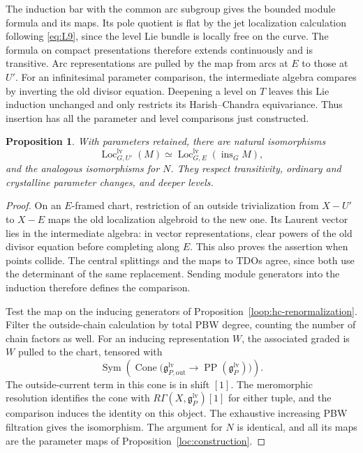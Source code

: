 \documentclass[11pt]{article}
\numberwithin{equation}{section}
\newtheorem{proposition}[theorem]{Proposition}
\theoremstyle{definition}
\theoremstyle{remark}
\begin{document}
The induction bar with the common arc subgroup gives the bounded
module formula and its maps.  Its pole quotient is flat by the jet
localization calculation following \eqref{eq:L9}, since the level Lie
bundle is locally free on the curve.  The formula on compact
presentations therefore extends continuously and is transitive.
Arc representations are pulled by the map from arcs at $E$ to those
at $U'$.  For an infinitesimal parameter comparison, the intermediate
algebra compares by inverting the old divisor equation.  Deepening a
level on $T$ leaves this Lie induction unchanged and only restricts
its Harish--Chandra equivariance.  Thus insertion has all the parameter
and level comparisons just constructed.

\begin{proposition}\label{loc:propagation}
With parameters retained, there are natural isomorphisms
\begin{equation}\label{eq:T3}
 \operatorname{Loc}_{G,U'}^{\mathrm{lv}}(M)
 \simeq
 \operatorname{Loc}_{G,E}^{\mathrm{lv}}(
                      \operatorname{ins}_G M),
\end{equation}
and the analogous isomorphisms for $N$.  They respect transitivity,
ordinary and crystalline parameter changes, and deeper levels.
\end{proposition}

\begin{proof}
On an $E$-framed chart, restriction of an outside trivialization from
$X-U'$ to $X-E$ maps the old localization algebroid to the new one.
Its Laurent vector lies in the intermediate algebra: in vector
representations, clear powers of the old divisor equation before
completing along $E$.  This also proves the assertion when points
collide.  The central splittings and the maps to TDOs agree, since
both use the determinant of the same replacement.  Sending module
generators into the induction therefore defines the comparison.

Test the map on the inducing generators of
Proposition~\ref{loop:hc-renormalization}.  Filter the
outside-chain calculation by total PBW degree, counting the number
of chain factors as well.  For an inducing representation $W$, the
associated graded is $W$ pulled to the chart, tensored with
\[
 \operatorname{Sym}\!\left(
  \operatorname{Cone}\bigl(
   \mathfrak g^{\mathrm{lv}}_{P,\mathrm{out}}
     \longrightarrow\operatorname{PP}(
                              \mathfrak g^{\mathrm{lv}}_P)
                     \bigr)\right).
\]
The outside-current term in this cone is in shift $[1]$.
The meromorphic resolution identifies the cone with
$R\Gamma(X,\mathfrak g^{\mathrm{lv}}_P)[1]$ for either tuple,
and the comparison induces the identity on this object.  The
exhaustive increasing PBW filtration gives the isomorphism.  The
argument for $N$ is identical, and all its maps are the parameter
maps of Proposition~\ref{loc:construction}.
\end{proof}
\end{document}
